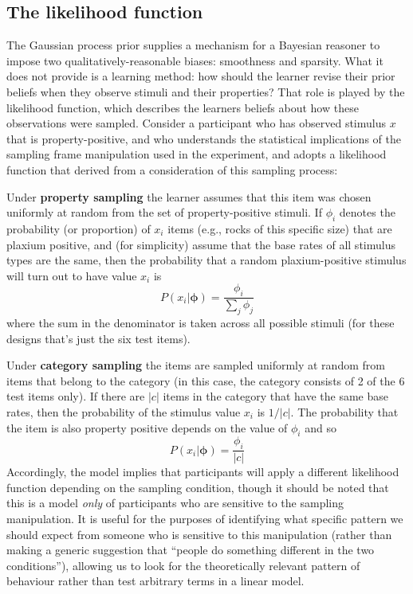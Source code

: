 \documentclass[
  english,
  doc]{apa6}
\begin{document}
\hypertarget{the-likelihood-function}{%
\subsection{The likelihood function}\label{the-likelihood-function}}

\noindent
The Gaussian process prior supplies a mechanism for a Bayesian reasoner to impose two qualitatively-reasonable biases: smoothness and sparsity. What it does not provide is a learning method: how should the learner revise their prior beliefs when they observe stimuli and their properties? That role is played by the likelihood function, which describes the learners beliefs about how these observations were sampled. Consider a participant who has observed stimulus \(x\) that is property-positive, and who understands the statistical implications of the sampling frame manipulation used in the experiment, and adopts a likelihood function that derived from a consideration of this sampling process:

Under \textbf{property sampling} the learner assumes that this item was chosen uniformly at random from the set of property-positive stimuli. If \(\phi_i\) denotes the probability (or proportion) of \(x_i\) items (e.g., rocks of this specific size) that are plaxium positive, and (for simplicity) assume that the base rates of all stimulus types are the same, then the probability that a random plaxium-positive stimulus will turn out to have value \(x_i\) is
\[
P(x_i | \bm{\phi}) = \frac{\phi_i}{\sum_j \phi_j}
\]
where the sum in the denominator is taken across all possible stimuli (for these designs that's just the six test items).

Under \textbf{category sampling} the items are sampled uniformly at random from items that belong to the category (in this case, the category consists of 2 of the 6 test items only). If there are \(|c|\) items in the category that have the same base rates, then the probability of the stimulus value \(x_i\) is \(1/|c|\). The probability that the item is also property positive depends on the value of \(\phi_i\) and so
\[
P(x_i | \bm{\phi}) = \frac{\phi_i}{|c|}
\]
Accordingly, the model implies that participants will apply a different likelihood function depending on the sampling condition, though it should be noted that this is a model \emph{only} of participants who are sensitive to the sampling manipulation. It is useful for the purposes of identifying what specific pattern we should expect from someone who is sensitive to this manipulation (rather than making a generic suggestion that \enquote{people do something different in the two conditions}), allowing us to look for the theoretically relevant pattern of behaviour rather than test arbitrary terms in a linear model.
\end{document}
